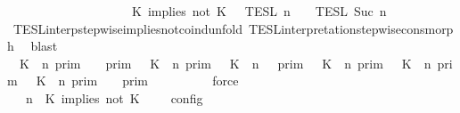 \begin{isabellebody}
\ \ \ \ \ \ \ \ \ \ \ \ \ \ \ \ \ \ {\isacharequal}\ {\isasymlbrakk}{\isasymlbrakk}\ {\isacharparenleft}K\ implies\ not\ K\ {\isacharhash}\ {\isasymPsi}\ {\isasymrbrakk}{\isasymrbrakk}\isactrlsub T\isactrlsub E\isactrlsub S\isactrlsub L\isactrlbsup {\isasymge}\ n\isactrlesup \ {\isasyminter}\ {\isasymlbrakk}{\isasymlbrakk}\ {\isasymPhi}\ {\isasymrbrakk}{\isasymrbrakk}\isactrlsub T\isactrlsub E\isactrlsub S\isactrlsub L\isactrlbsup {\isasymge}\ Suc\ n\isactrlesup {\isacartoucheclose}\isanewline
\ \ \ \ \ \ \ \ \isamarkupfalse%
\ TESL{\isacharunderscore}interp{\isacharunderscore}stepwise{\isacharunderscore}implies{\isacharunderscore}not{\isacharunderscore}coind{\isacharunderscore}unfold\ TESL{\isacharunderscore}interpretation{\isacharunderscore}stepwise{\isacharunderscore}cons{\isacharunderscore}morph\ \isamarkupfalse%
\ blast\isanewline
\ \ \ \ \ \ \isamarkupfalse%
\ {\isacartoucheopen}{\isasymlbrakk}\ K\ {\isasymnot}{\isasymUp}\ n\ {\isasymrbrakk}\isactrlsub p\isactrlsub r\isactrlsub i\isactrlsub m\ {\isasyminter}\ {\isasymlbrakk}{\isasymlbrakk}\ {\isasymGamma}\ {\isasymrbrakk}{\isasymrbrakk}\isactrlsub p\isactrlsub r\isactrlsub i\isactrlsub m\ {\isasymunion}\ {\isasymlbrakk}\ K\ {\isasymUp}\ n\ {\isasymrbrakk}\isactrlsub p\isactrlsub r\isactrlsub i\isactrlsub m\ {\isasyminter}\ {\isasymlbrakk}{\isasymlbrakk}\ {\isacharparenleft}K\ {\isasymnot}{\isasymUp}\ n{\isacharparenright}\ {\isacharhash}\ {\isasymGamma}\ {\isasymrbrakk}{\isasymrbrakk}\isactrlsub p\isactrlsub r\isactrlsub i\isactrlsub m\ {\isacharequal}\ {\isacharparenleft}{\isasymlbrakk}\ K\ {\isasymnot}{\isasymUp}\ n\ {\isasymrbrakk}\isactrlsub p\isactrlsub r\isactrlsub i\isactrlsub m\ {\isasymunion}\ {\isasymlbrakk}\ K\ {\isasymUp}\ n\ {\isasymrbrakk}\isactrlsub p\isactrlsub r\isactrlsub i\isactrlsub m\ {\isasyminter}\ {\isasymlbrakk}\ K\ {\isasymnot}{\isasymUp}\ n\ {\isasymrbrakk}\isactrlsub p\isactrlsub r\isactrlsub i\isactrlsub m{\isacharparenright}\ {\isasyminter}\ {\isasymlbrakk}{\isasymlbrakk}\ {\isasymGamma}\ {\isasymrbrakk}{\isasymrbrakk}\isactrlsub p\isactrlsub r\isactrlsub i\isactrlsub m{\isacartoucheclose}\isanewline
\ \ \ \ \ \ \ \ \isamarkupfalse%
\ force\isanewline
\ \ \ \ \ \ \isamarkupfalse%
\ \isamarkupfalse%
\ {\isacartoucheopen}{\isasymlbrakk}\ {\isasymGamma}{\isacharcomma}\ n\ {\isasymturnstile}\ {\isacharparenleft}{\isacharparenleft}K\ implies\ not\ K\ {\isacharhash}\ {\isasymPsi}{\isacharparenright}\ {\isasymtriangleright}\ {\isasymPhi}\ {\isasymrbrakk}\isactrlsub c\isactrlsub o\isactrlsub n\isactrlsub f\isactrlsub i\isactrlsub g\isanewline

\end{isabellebody}
